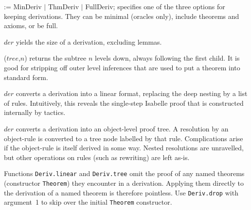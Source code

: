 \begin{ttdescription}
\item[\ttindexbold{keep_derivs} := MinDeriv $|$ ThmDeriv $|$ FullDeriv;] 
specifies one of the three options for keeping derivations.  They can be
minimal (oracles only), include theorems and axioms, or be full.

\item[\ttindexbold{Deriv.size} $der$] yields the size of a derivation,
  excluding lemmas.

\item[\ttindexbold{Deriv.drop} ($tree$,$n$)] returns the subtree $n$ levels
  down, always following the first child.  It is good for stripping off
  outer level inferences that are used to put a theorem into standard form.

\item[\ttindexbold{Deriv.linear} $der$] converts a derivation into a linear
  format, replacing the deep nesting by a list of rules.  Intuitively, this
  reveals the single-step Isabelle proof that is constructed internally by
  tactics.  

\item[\ttindexbold{Deriv.tree} $der$] converts a derivation into an
  object-level proof tree.  A resolution by an object-rule is converted to a
  tree node labelled by that rule.  Complications arise if the object-rule is
  itself derived in some way.  Nested resolutions are unravelled, but other
  operations on rules (such as rewriting) are left as-is.  
\end{ttdescription}

Functions {\tt Deriv.linear} and {\tt Deriv.tree} omit the proof of any named
theorems (constructor {\tt Theorem}) they encounter in a derivation.  Applying
them directly to the derivation of a named theorem is therefore pointless.
Use {\tt Deriv.drop} with argument~1 to skip over the initial {\tt Theorem}
constructor.



